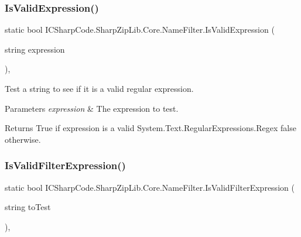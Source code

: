 \subsubsection{\texorpdfstring{Is\+Valid\+Expression()}{IsValidExpression()}}
{\footnotesize\ttfamily static bool I\+C\+Sharp\+Code.\+Sharp\+Zip\+Lib.\+Core.\+Name\+Filter.\+Is\+Valid\+Expression (\begin{DoxyParamCaption}\item[{string}]{expression }\end{DoxyParamCaption})\hspace{0.3cm}{\ttfamily [inline]}, {\ttfamily [static]}}



Test a string to see if it is a valid regular expression. 


\begin{DoxyParams}{Parameters}
{\em expression} & The expression to test.\\
\hline
\end{DoxyParams}
\begin{DoxyReturn}{Returns}
True if expression is a valid System.\+Text.\+Regular\+Expressions.\+Regex false otherwise.
\end{DoxyReturn}
\mbox{\label{class_i_c_sharp_code_1_1_sharp_zip_lib_1_1_core_1_1_name_filter_a861e7d6873266c46847e7bb176afe70a}} 
\subsubsection{\texorpdfstring{Is\+Valid\+Filter\+Expression()}{IsValidFilterExpression()}}
{\footnotesize\ttfamily static bool I\+C\+Sharp\+Code.\+Sharp\+Zip\+Lib.\+Core.\+Name\+Filter.\+Is\+Valid\+Filter\+Expression (\begin{DoxyParamCaption}\item[{string}]{to\+Test }\end{DoxyParamCaption})\hspace{0.3cm}{\ttfamily [inline]}, {\ttfamily [static]}}



